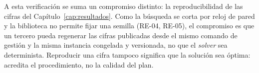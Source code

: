 A esta verificación se suma un compromiso distinto: la reproducibilidad de las cifras del
Capítulo~\ref{cap:resultados}. Como la búsqueda se corta por reloj de pared y la biblioteca no
permite fijar una semilla (RE-04, RE-05), el compromiso es que un tercero pueda regenerar las
cifras publicadas desde el mismo comando de gestión y la misma instancia congelada y versionada, no
que el \textit{solver} sea determinista. Reproducir una cifra tampoco significa que la solución sea
óptima: acredita el procedimiento, no la calidad del plan.
